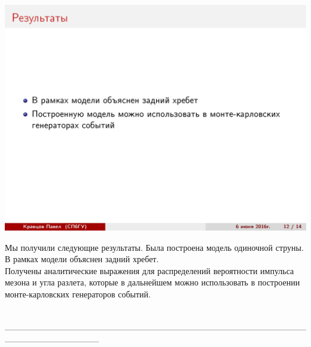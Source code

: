 \documentclass[14pt]{article}
\renewcommand{\line}{\\ \_\_\_\_\_\_\_\_\_\_\_\_\_\_\_\_\_\_\_\_\_\_\_\_\_\_\_\_\_\_\_\_\_\_\_\_\_\_\_\_\_\_\_\_\_\_\_\_\_\_\_\_\_\_\_\_\_\_\_\_\_\_\_ \\ }
\begin{document}
\begin{minipage}[h]{0.5\linewidth}
\includegraphics[width=1\linewidth]{page-12.jpg}
\end{minipage}
\begin{minipage}[h]{0.45\linewidth}
Мы получили следующие результаты.
Была построена модель одиночной струны. \\
В рамках модели объяснен задний хребет. \\
Получены аналитические выражения для распределений вероятности импульса мезона и угла разлета, которые в дальнейшем можно использовать в построении монте-карловских генераторов событий.
\end{minipage}
\line
\end{document}
